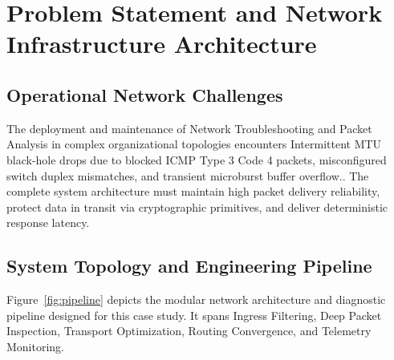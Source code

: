 \section{Problem Statement and Network Infrastructure Architecture}

\subsection{Operational Network Challenges}
The deployment and maintenance of Network Troubleshooting and Packet Analysis in complex organizational topologies encounters Intermittent MTU black-hole drops due to blocked ICMP Type 3 Code 4 packets, misconfigured switch duplex mismatches, and transient microburst buffer overflow.. The complete system architecture must maintain high packet delivery reliability, protect data in transit via cryptographic primitives, and deliver deterministic response latency.

\subsection{System Topology and Engineering Pipeline}
Figure~\ref{fig:pipeline} depicts the modular network architecture and diagnostic pipeline designed for this case study. It spans Ingress Filtering, Deep Packet Inspection, Transport Optimization, Routing Convergence, and Telemetry Monitoring.

